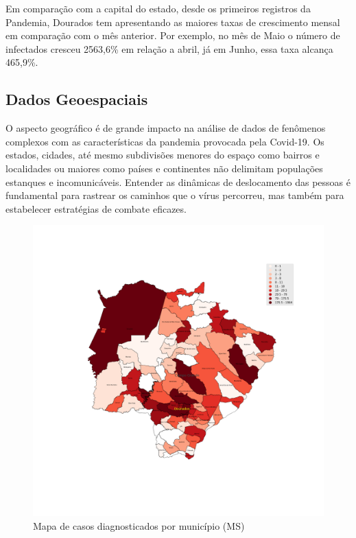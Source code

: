 \documentclass[12pt]{article}
\begin{document}
Em comparação com a capital do estado, desde os primeiros registros da Pandemia, Dourados tem apresentando as maiores taxas de crescimento mensal em comparação com o mês anterior. Por exemplo, no mês de Maio o número de infectados cresceu 2563,6\% em relação a abril, já  em  Junho, essa taxa alcança 465,9\%.

\subsection{Dados Geoespaciais}\label{ssec:geo}

O aspecto geográfico é de grande impacto na análise de dados de fenômenos complexos com as características da pandemia provocada pela Covid-19. Os estados, cidades, até mesmo subdivisões menores do espaço como bairros e localidades ou maiores como países e continentes não delimitam populações estanques e incomunicáveis. Entender as dinâmicas de deslocamento das pessoas é fundamental para rastrear os caminhos que o vírus percorreu, mas também para estabelecer estratégias de combate eficazes.

\begin{figure}[!htb]
  \centering
  \includegraphics[width=1\textwidth]{figs/mapa_casos_registrados.png}
  \caption{Mapa de casos diagnosticados por município (MS)}
  \label{fig:mapaCasos}
  \end{figure}
\end{document}
